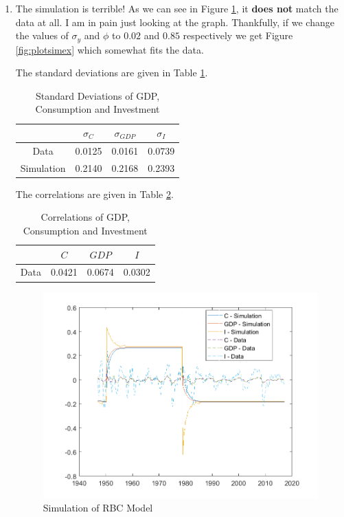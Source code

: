\documentclass[12pt]{article}
\theoremstyle{definition}
\begin{document}
\begin{enumerate}[1.]
\item 
	
	 The simulation is terrible! As we can see in Figure \ref{fig:plotsim}, it \textbf{does not} match the data at all. I am in pain just looking at the graph. Thankfully, if we change the values of $\sigma_y$ and $\phi$ to $0.02$ and $0.85$ respectively we get Figure \ref{fig:plotsimex} which somewhat fits the data.
	 
	
	 The standard deviations are given in Table \ref{tab:sd}.
	 \begin{table}[H]
	 	\centering
	 \begin{tabular}{|c|c|c|c|}
	 	\hline 
	 	& $\sigma_C$ & $\sigma_{GDP}$ & $\sigma_I$ \\ 
	 	\hline 
	 	Data & 0.0125 & 0.0161 & 0.0739 \\ 
	 	\hline 
	 	Simulation & 0.2140 & 0.2168 & 0.2393 \\ 
	 	\hline 
	 \end{tabular} 
 \caption{Standard Deviations of GDP, Consumption and Investment}
 	 	\label{tab:sd}
\end{table}

 The correlations are given in Table \ref{tab:corr}.
\begin{table}[H]
	\centering
	\begin{tabular}{|c|c|c|c|}
		\hline 
		& $C$ & ${GDP}$ & $I$ \\ 
		\hline 
		Data & 0.0421 & 0.0674 & 0.0302 \\ 
		\hline 
	\end{tabular} 
	\caption{Correlations of GDP, Consumption and Investment}
	\label{tab:corr}
\end{table}
 
	\begin{figure}[H]
		\centering
		\includegraphics[width=\linewidth]{plot_sim}
		\caption{Simulation of RBC Model}
		\label{fig:plotsim}
	\end{figure}


\end{enumerate}
\end{document}
